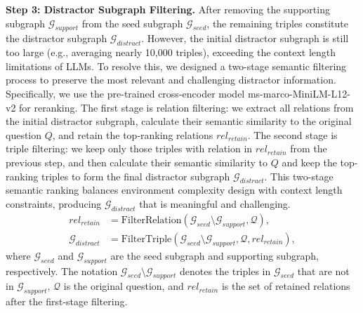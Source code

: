 \documentclass{article} %
\begin{document}
\textbf{Step 3: Distractor Subgraph Filtering.}
After removing the supporting subgraph $\mathcal{G}_{support}$ from the seed subgraph $\mathcal{G}_{seed}$, the remaining triples constitute the distractor subgraph $\mathcal{G}_{distract}$. However, the initial distractor subgraph is still too large (e.g., averaging nearly 10,000 triples), exceeding the context length limitations of LLMs. To resolve this, we designed a two-stage semantic filtering process to preserve the most relevant and challenging distractor information. 
Specifically, we use the pre-trained cross-encoder model ms-marco-MiniLM-L12-v2 for reranking. The first stage is relation filtering: we extract all relations from the initial distractor subgraph, calculate their semantic similarity to the original question $Q$, and retain the top-ranking relations $rel_{retain}$. The second stage is triple filtering: we keep only those triples with relation in $rel_{retain}$ from the previous step, and then calculate their semantic similarity to $Q$ and keep the top-ranking triples to form the final distractor subgraph $\mathcal{G}_{distract}$. 
This two-stage semantic ranking balances environment complexity design with context length constraints, producing $\mathcal{G}_{distract}$ that is meaningful and challenging.
\begin{align}
rel_{retain} &= \text{FilterRelation}(\mathcal{G}_{seed} \setminus \mathcal{G}_{support}, \mathcal{Q}), \\
\mathcal{G}_{distract} &= \text{FilterTriple}(\mathcal{G}_{seed} \setminus \mathcal{G}_{support}, \mathcal{Q}, rel_{retain}),
\end{align}
where $\mathcal{G}_{seed}$ and $\mathcal{G}_{support}$ are the seed subgraph and supporting subgraph, respectively. The notation $\mathcal{G}_{seed} \setminus \mathcal{G}_{support}$ denotes the triples in $\mathcal{G}_{seed}$ that are not in $\mathcal{G}_{support}$, $\mathcal{Q}$ is the original question, and $rel_{retain}$ is the set of retained relations after the first-stage filtering.
\end{document}
